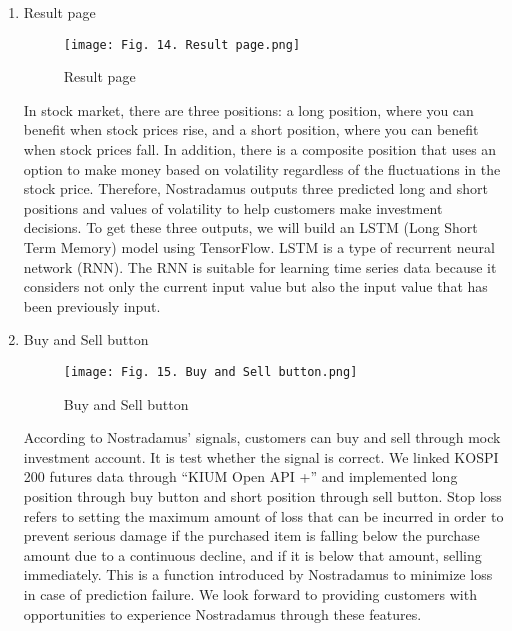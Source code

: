 \documentclass[conference]{IEEEtran}
\begin{document}
\begin{enumerate}
    
    \item Result page
    \begin{figure}[h]
    \begin{center}
        \centering
        \texttt{[image: Fig. 14. Result page.png]}
        \caption{Result page}
        \label{fig:my_label}
    \end{center}
    \end{figure}
    
    In stock market, there are three positions: a long position, where you can benefit when stock prices rise, and a short position, where you can benefit when stock prices fall. In addition, there is a composite position that uses an option to make money based on volatility regardless of the fluctuations in the stock price. Therefore, Nostradamus outputs three predicted long and short positions and values of volatility to help customers make investment decisions. To get these three outputs, we will build an LSTM (Long Short Term Memory) model using TensorFlow. LSTM is a type of recurrent neural network (RNN). The RNN is suitable for learning time series data because it considers not only the current input value but also the input value that has been previously input.\vspace{1\baselineskip}
    
    \item Buy and Sell button
    \begin{figure}[h]
    \begin{center}
        \centering
        \texttt{[image: Fig. 15. Buy and Sell button.png]}
        \caption{Buy and Sell button}
        \label{fig:my_label}
    \end{center}
    \end{figure}
    
    According to Nostradamus' signals, customers can buy and sell through mock investment account. It is   test whether the signal is correct. We linked KOSPI 200 futures data through “KIUM Open API +” and implemented long position through buy button and short position through sell button. Stop loss refers to setting the maximum amount of loss that can be incurred in order to prevent serious damage if the purchased item is falling below the purchase amount due to a continuous decline, and if it is below that amount, selling immediately. This is a function introduced by Nostradamus to minimize loss in case of prediction failure. We look forward to providing customers with opportunities to experience Nostradamus through these features.
    

\end{enumerate}
\end{document}
